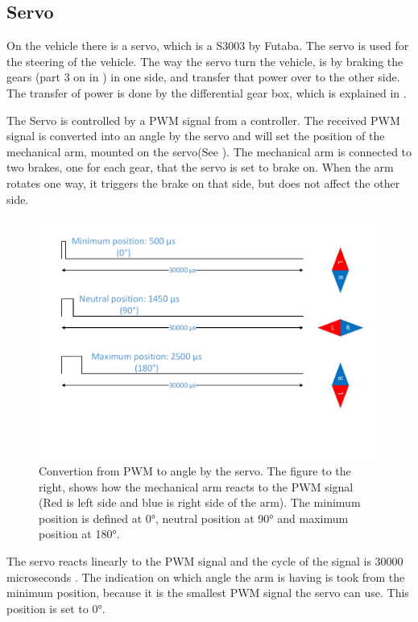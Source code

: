 \subsection{Servo}
On the vehicle there is a servo, which is a S3003 by Futaba. 
The servo is used for the steering of the vehicle. The way the servo turn the vehicle, is by braking the gears (part 3 on  in ) in one side, and transfer that power over to the other side. The transfer of power is done by the differential gear box, which is explained in .

The Servo is controlled by a PWM signal from a controller. The received PWM signal is converted into an angle by the servo and will set the position of the mechanical arm, mounted on the servo(See ). The mechanical arm is connected to two brakes, one for each gear, that the servo is set to brake on. When the arm rotates one way, it triggers the brake on that side, but does not affect the other side.

\begin{figure}[H]
	\centering
	\includegraphics[scale=0.6]{figures/TimeVSangle.pdf}
	\caption{Convertion from PWM to angle by the servo. The figure to the right, shows how the mechanical arm reacts to the PWM signal (Red is left side and blue is right side of the arm). The minimum position is defined at 0°, neutral position at 90° and maximum position at 180°.}
	\label{timeVSangle}
\end{figure}

The servo reacts linearly to the PWM signal and the cycle of the signal is 30000 microseconds . The indication on which angle the arm is having is took from the minimum position, because it is the smallest PWM signal the servo can use. This position is set to 0°.
 
